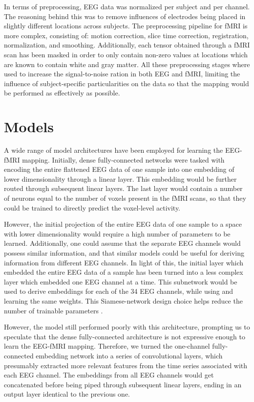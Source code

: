 \documentclass{article}
\begin{document}
In terms of preprocessing, EEG data was normalized per subject and per channel. The reasoning behind this was to remove influences of electrodes being placed in slightly different locations across subjects. The preprocessing pipeline for fMRI is more complex, consisting of: motion correction, slice time correction, registration, normalization, and smoothing. Additionally, each tensor obtained through a fMRI scan has been masked in order to only contain non-zero values at locations which are known to contain white and gray matter. All these preprocessing stages where used to increase the signal-to-noise ration in both EEG and fMRI, limiting the influence of subject-specific particularities on the data so that the mapping would be performed as effectively as possible.

\section{Models}

A wide range of model architectures have been employed for learning the EEG-fMRI mapping. Initially, dense fully-connected networks were tasked with encoding the entire flattened EEG data of one sample into one embedding of lower dimensionality through a linear layer. This embedding would be further routed through subsequent linear layers. The last layer would contain a number of neurons equal to the number of voxels present in the fMRI scans, so that they could be trained to directly predict the voxel-level activity.

However, the initial projection of the entire EEG data of one sample to a space with lower dimensionality would require a high number of parameters to be learned. Additionally, one could assume that the separate EEG channels would possess similar information, and that similar models could be useful for deriving information from different EEG channels. In light of this, the initial layer which embedded the entire EEG data of a sample has been turned into a less complex layer which embedded one EEG channel at a time. This subnetwork would be used to derive embeddings for each of the 34 EEG channels, while using and learning the same weights. This Siamese-network design choice helps reduce the number of trainable parameters \cite{bromley_signature_nodate}.

However, the model still performed poorly with this architecture, prompting us to speculate that the dense fully-connected architecture is not expressive enough to learn the EEG-fMRI mapping. Therefore, we turned the one-channel fully-connected embedding network into a series of convolutional layers, which presumably extracted more relevant features from the time series associated with each EEG channel. The embeddings from all EEG channels would get concatenated before being piped through subsequent linear layers, ending in an output layer identical to the previous one.
\end{document}
